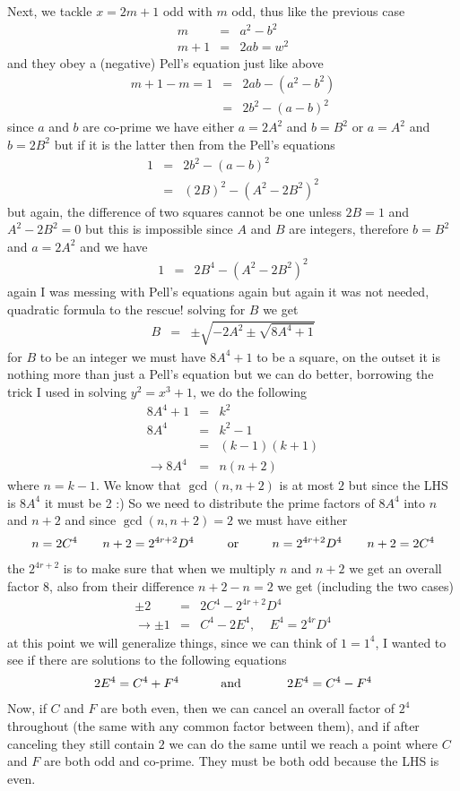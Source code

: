 \documentclass[aps,preprint,preprintnumbers,nofootinbib,showpacs,prd]{revtex4-1}
\newcommand{\nbea}{\begin{eqnarray*}}
\newcommand{\neea}{\end{eqnarray*}}
\begin{document}
Next, we tackle $x = 2m + 1$ odd with $m$ odd, thus like the previous case
%
\nbea
m & = & a^2 - b^2 \\
m + 1 & = & 2ab = w^2
\neea
%
and they obey a (negative) Pell's equation just like above
%
\nbea
m + 1 - m = 1 & = & 2ab - (a^2 - b^2) \\
& = & 2b^2 - (a - b)^2
\neea
%
since $a$ and $b$ are co-prime we have either $a = 2A^2$ and $b = B^2$ or $a = A^2$ and $b = 2B^2$ but if it is the latter then from the Pell's equations
%
\nbea
1 & = & 2b^2 - (a - b)^2 \\
& = & (2B)^2 - (A^2-2B^2)^2
\neea
%
but again, the difference of two squares cannot be one unless $2B = 1$ and $A^2 - 2B^2 = 0$ but this is impossible since $A$ and $B$ are integers, therefore $b = B^2$ and $a = 2A^2$ and we have
%
\nbea
1 & = & 2B^4 - (A^2 - 2B^2)^2
\neea
%
again I was messing with Pell's equations again but again it was not needed, quadratic formula to the rescue! solving for $B$ we get
%
\nbea
B & = & \pm \sqrt{-2A^2 \pm\sqrt{8A^4 + 1}}
\neea
%
for $B$ to be an integer we must have $8A^4 + 1$ to be a square, on the outset it is nothing more than just a Pell's equation but we can do better, borrowing the trick I used in solving $y^2 = x^3 + 1$, we do the following
%
\nbea
8A^4 + 1 & = & k^2 \\
8A^4 & = & k^2 - 1 \\
& = & (k - 1)(k + 1) \\
\to 8A^4 & = & n(n + 2)
\neea
%
where $n = k - 1$. We know that $\gcd(n, n+2)$ is at most $2$ but since the LHS is $8A^4$ it must be 2 :) So we need to distribute the prime factors of $8A^4$ into $n$ and $n + 2$ and since $\gcd(n,n+2) = 2$ we must have either
%
\nbea
n = 2C^4 ~~~~~~ n + 2 = 2^{4r + 2}D^4 ~~~~~~~~{\rm or} ~~~~~~~~n = 2^{4r + 2}D^4  ~~~~~~ n + 2 = 2C^4
\neea
%
the $2^{4r + 2}$ is to make sure that when we multiply $n$ and $n + 2$ we get an overall factor $8$, also from their difference $n + 2 - n = 2$ we get (including the two cases)
%
\nbea
\pm2 & = & 2C^4 - 2^{4r + 2}D^4 \\
\to \pm 1 & = & C^4 - 2E^4, ~~~~~ E^4 = 2^{4r}D^4
\neea
%
at this point we will generalize things, since we can think of $1 = 1^4$, I wanted to see if there are solutions to the following equations
%
\nbea
2E^4 = C^4 + F^4 ~~~~~~~~~~{\rm and} ~~~~~~~~~~~2E^4 = C^4 - F^4 
\neea
%
Now, if $C$ and $F$ are both even, then we can cancel an overall factor of $2^4$ throughout (the same with any common factor between them), and if after canceling they still contain $2$ we can do the same until we reach a point where $C$ and $F$ are both odd and co-prime. They must be both odd because the LHS is even.
\end{document}
